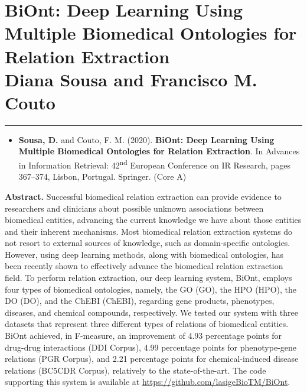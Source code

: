 \hypertarget{3}{}


\chapter[BiOnt: Deep Learning Using Multiple Biomedical Ontologies for Relation Extraction]
{\huge BiOnt: Deep Learning Using Multiple Biomedical Ontologies for Relation Extraction \\
\Large \textmd{Diana Sousa and Francisco M. Couto}}

\vspace{-1.6cm}

\begingroup
\color{black}
\par\noindent\rule{\textwidth}{0.4pt}
\endgroup


\begin{itemize}[label=]
    \item{\textbf{Sousa, D.} and Couto, F. M. (2020). \textbf{BiOnt: Deep Learning Using Multiple Biomedical Ontologies for Relation Extraction}. In Advances in Information Retrieval: 42\textsuperscript{nd} European Conference on IR Research, pages 367–374, Lisbon, Portugal. Springer. (Core A) \citep{sousa2020biont}} 
\end{itemize}

\textbf{Abstract.} Successful biomedical relation extraction can provide evidence to researchers and clinicians about possible unknown associations between biomedical entities, advancing the current knowledge we have about those entities and their inherent mechanisms. Most biomedical relation extraction systems do not resort to external sources of knowledge, such as domain-specific ontologies. However, using deep learning methods, along with biomedical ontologies, has been recently shown to effectively advance the biomedical relation extraction field. To perform relation extraction, our deep learning system, BiOnt, employs four types of biomedical ontologies, namely, the \acl{GO} (GO), the \acl{HPO} (HPO), the \acl{DO} (DO), and the \acl{ChEBI} (ChEBI), regarding gene products, phenotypes, diseases, and chemical compounds, respectively. We tested our system with three datasets that represent three different types of relations of biomedical entities. BiOnt achieved, in F-measure, an improvement of 4.93 percentage points for drug-drug interactions (\acs{DDI} Corpus), 4.99 percentage points for phenotype-gene relations (\acs{PGR} Corpus), and 2.21 percentage points for chemical-induced disease relations (\acs{BC5CDR} Corpus), relatively to the state-of-the-art. The code supporting this system is available at \url{https://github.com/lasigeBioTM/BiOnt}.

